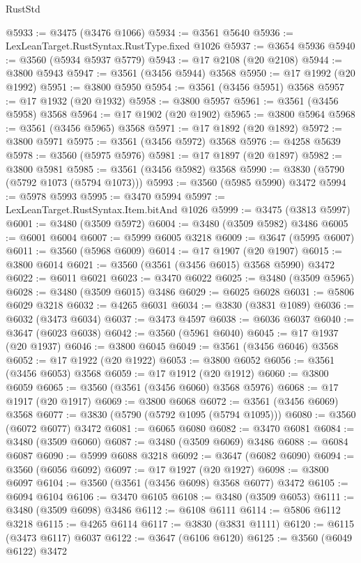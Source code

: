 \begin{lexlean}{RustStd}
\begin{coremodule}
@5933 := @3475 (@3476 @1066)
@5934 := @3561 @5640
@5936 := LexLeanTarget.RustSyntax.RustType.fixed @1026
@5937 := @3654 @5936
@5940 := @3560 (@5934 @5937 @5779)
@5943 := @17 @2108 (@20 @2108)
@5944 := @3800 @5943
@5947 := @3561 (@3456 @5944) @3568
@5950 := @17 @1992 (@20 @1992)
@5951 := @3800 @5950
@5954 := @3561 (@3456 @5951) @3568
@5957 := @17 @1932 (@20 @1932)
@5958 := @3800 @5957
@5961 := @3561 (@3456 @5958) @3568
@5964 := @17 @1902 (@20 @1902)
@5965 := @3800 @5964
@5968 := @3561 (@3456 @5965) @3568
@5971 := @17 @1892 (@20 @1892)
@5972 := @3800 @5971
@5975 := @3561 (@3456 @5972) @3568
@5976 := @4258 @5639
@5978 := @3560 (@5975 @5976)
@5981 := @17 @1897 (@20 @1897)
@5982 := @3800 @5981
@5985 := @3561 (@3456 @5982) @3568
@5990 := @3830 (@5790 (@5792 @1073 (@5794 @1073)))
@5993 := @3560 (@5985 @5990) @3472
@5994 := @5978 @5993
@5995 := @3470 @5994
@5997 := LexLeanTarget.RustSyntax.Item.bitAnd @1026
@5999 := @3475 (@3813 @5997)
@6001 := @3480 (@3509 @5972)
@6004 := @3480 (@3509 @5982) @3486
@6005 := @6001 @6004
@6007 := @5999 @6005 @3218
@6009 := @3647 (@5995 @6007)
@6011 := @3560 (@5968 @6009)
@6014 := @17 @1907 (@20 @1907)
@6015 := @3800 @6014
@6021 := @3560 (@3561 (@3456 @6015) @3568 @5990) @3472
@6022 := @6011 @6021
@6023 := @3470 @6022
@6025 := @3480 (@3509 @5965)
@6028 := @3480 (@3509 @6015) @3486
@6029 := @6025 @6028
@6031 := @5806 @6029 @3218
@6032 := @4265 @6031
@6034 := @3830 (@3831 @1089)
@6036 := @6032 (@3473 @6034)
@6037 := @3473 @4597
@6038 := @6036 @6037
@6040 := @3647 (@6023 @6038)
@6042 := @3560 (@5961 @6040)
@6045 := @17 @1937 (@20 @1937)
@6046 := @3800 @6045
@6049 := @3561 (@3456 @6046) @3568
@6052 := @17 @1922 (@20 @1922)
@6053 := @3800 @6052
@6056 := @3561 (@3456 @6053) @3568
@6059 := @17 @1912 (@20 @1912)
@6060 := @3800 @6059
@6065 := @3560 (@3561 (@3456 @6060) @3568 @5976)
@6068 := @17 @1917 (@20 @1917)
@6069 := @3800 @6068
@6072 := @3561 (@3456 @6069) @3568
@6077 := @3830 (@5790 (@5792 @1095 (@5794 @1095)))
@6080 := @3560 (@6072 @6077) @3472
@6081 := @6065 @6080
@6082 := @3470 @6081
@6084 := @3480 (@3509 @6060)
@6087 := @3480 (@3509 @6069) @3486
@6088 := @6084 @6087
@6090 := @5999 @6088 @3218
@6092 := @3647 (@6082 @6090)
@6094 := @3560 (@6056 @6092)
@6097 := @17 @1927 (@20 @1927)
@6098 := @3800 @6097
@6104 := @3560 (@3561 (@3456 @6098) @3568 @6077) @3472
@6105 := @6094 @6104
@6106 := @3470 @6105
@6108 := @3480 (@3509 @6053)
@6111 := @3480 (@3509 @6098) @3486
@6112 := @6108 @6111
@6114 := @5806 @6112 @3218
@6115 := @4265 @6114
@6117 := @3830 (@3831 @1111)
@6120 := @6115 (@3473 @6117) @6037
@6122 := @3647 (@6106 @6120)
@6125 := @3560 (@6049 @6122) @3472

\end{coremodule}
\end{lexlean}
